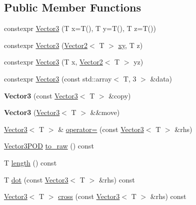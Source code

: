 \subsection*{Public Member Functions}
\begin{DoxyCompactItemize}
\item 
constexpr \mbox{\hyperlink{class_vector3_a178a04d4beb16f042004790b6baa714f}{Vector3}} (T x=T(), T y=T(), T z=T())
\item 
constexpr \mbox{\hyperlink{class_vector3_a40fa107fe5960ff70390a3a633cc6aca}{Vector3}} (\mbox{\hyperlink{class_vector2}{Vector2}}$<$ T $>$ \mbox{\hyperlink{class_vector3_ae129388b328e1989ae6fe671fb0f73eb}{xy}}, T z)
\item 
constexpr \mbox{\hyperlink{class_vector3_a4ff09d057f11f07432524c8b903e871f}{Vector3}} (T x, \mbox{\hyperlink{class_vector2}{Vector2}}$<$ T $>$ yz)
\item 
constexpr \mbox{\hyperlink{class_vector3_a071a8ad60a3a8ab6e07b868c5c5fd617}{Vector3}} (const std\+::array$<$ T, 3 $>$ \&data)
\item 
\mbox{\label{class_vector3_a485af798ead31cdba0703fea76802b6d}} 
{\bfseries Vector3} (const \mbox{\hyperlink{class_vector3}{Vector3}}$<$ T $>$ \&copy)
\item 
\mbox{\label{class_vector3_a8d3d9e257e4deea57b6fb21ea3919a0d}} 
{\bfseries Vector3} (\mbox{\hyperlink{class_vector3}{Vector3}}$<$ T $>$ \&\&move)
\item 
\mbox{\hyperlink{class_vector3}{Vector3}}$<$ T $>$ \& \mbox{\hyperlink{class_vector3_ab8de8c58175e9e0beb4b71ed1e0ada1f}{operator=}} (const \mbox{\hyperlink{class_vector3}{Vector3}}$<$ T $>$ \&rhs)
\item 
\mbox{\hyperlink{struct_vector3_p_o_d}{Vector3\+P\+OD}} \mbox{\hyperlink{class_vector3_a9bc4a07b903235d5a0c81eeb75e856e0}{to\+\_\+raw}} () const
\item 
T \mbox{\hyperlink{class_vector3_aa5177b38edaae3717bc94443946345d0}{length}} () const
\item 
T \mbox{\hyperlink{class_vector3_abf12b7769b13982490e594877236abe1}{dot}} (const \mbox{\hyperlink{class_vector3}{Vector3}}$<$ T $>$ \&rhs) const
\item 
\mbox{\hyperlink{class_vector3}{Vector3}}$<$ T $>$ \mbox{\hyperlink{class_vector3_a55d165924a9c4c4fb29aba342259450f}{cross}} (const \mbox{\hyperlink{class_vector3}{Vector3}}$<$ T $>$ \&rhs) const
\item 

\end{DoxyCompactItemize}

